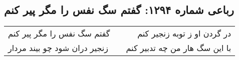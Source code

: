 \begin{center}
\section*{رباعی شماره ۱۲۹۴: گفتم سگ نفس را مگر پیر کنم}
\label{sec:1294}
\begin{longtable}{l p{0.5cm} r}
گفتم سگ نفس را مگر پیر کنم
&&
در گردن او ز توبه زنجیر کنم
\\
زنجیر دران شود چو بیند مردار
&&
با این سگ هار من چه تدبیر کنم
\\
\end{longtable}
\end{center}
